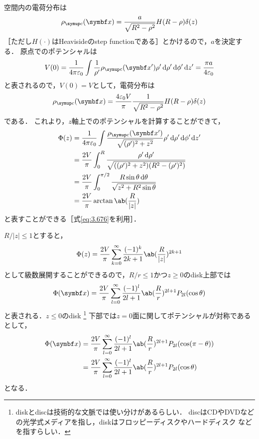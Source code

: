  \hrulefill\\
  空間内の電荷分布は
  \begin{gather}%
    \rho_{\mr{c}}(\bs{x}) = \frac{a}{\sqrt{R^2-\rho^2}} H(R-\rho) \delta(z)
  \end{gather}%
  ［ただし$H(\cdot)$はHeavisideのstep functionである］とかけるので，$a$を決定する．
  原点でのポテンシャルは
  \begin{gather}%
    V(0) = \frac{1}{4\pi \eps_0} \int \frac{1}{\rho'}\rho_{\mr{c}}(\bs{x'}) 
    \rho'\dl{\rho'} \dl{\phi'} \dl{z'}
    = \frac{\pi a}{4\eps_0}
  \end{gather}%
  と表されるので，$V(0) = V$として，電荷分布は
  \begin{gather}%
    \rho_{\mr{c}}(\bs{x}) = \frac{4\eps_0 V}{\pi} \frac{1}{\sqrt{R^2 - \rho^2}} 
    H(R-\rho) \delta(z)
  \end{gather}%
  である．
  これより，$z$軸上でのポテンシャルを計算することができて，
  \begin{align}%
    \Phi(z) &= \frac{1}{4\pi \eps_0} \int 
    \frac{\rho_{\mr{c}}(\bs{x'})}{\sqrt{(\rho')^2+z^2}} 
    \rho' \dl{\rho',\phi',z'}\notag\\
    &=\frac{2V}{\pi} \int_0^R \frac{\rho' \dl{\rho'}}
    {\sqrt{
      ((\rho')^2+z^2) (R^2-(\rho')^2)
    }}\notag\\
    &= \frac{2V}{\pi} \int_0^{\pi/2} 
    \frac{R\sin\theta\dl{\theta}}{\sqrt{z^2 + R^2\sin\theta}}\notag\\
    &= \frac{2V}{\pi} \arctan\ab(\frac{R}{|z|})
  \end{align}%
  と表すことができる［式\eqref{eq:3.676}を利用］．

  $R / |z| \leq 1$とすると，
  \begin{gather}%
    \Phi(z) = \frac{2V}{\pi} \sum_{k=0}^\infty \frac{(-1)^k}{2k+1} \ab(\frac{R}{|z|})^{2k+1}
  \end{gather}%
  として級数展開することができるので，$R / r \leq 1$かつ$z \geq 0$のdisk上部では
  \begin{gather}%
    \Phi(\bs{x}) = 
    \frac{2V}{\pi}\sum_{l=0}^\infty \frac{(-1)^l}{2l+1} \ab(\frac{R}{r})^{2l+1}
    P_{2l}(\cos\theta)
  \end{gather}%
  と表される．$z \leq 0$のdisk%
  \footnote{diskとdiscは技術的な文脈では使い分けがあるらしい．
  discはCDやDVDなどの光学式メディアを指し，diskはフロッピーディスクやハードディスク
  などを指すらしい．}
  下部では$z=0$面に関してポテンシャルが対称である
  として，
  \begin{align}%
    \Phi(\bs{x}) & = \frac{2V}{\pi}\sum_{l=0}^\infty \frac{(-1)^l}{2l+1} \ab(\frac{R}{r})^{2l+1}
    P_{2l}(\cos(\pi-\theta))\\
    &= 
    \frac{2V}{\pi}\sum_{l=0}^\infty \frac{(-1)^l}{2l+1} \ab(\frac{R}{r})^{2l+1}
    P_{2l}(\cos\theta)
  \end{align}%
  となる．

